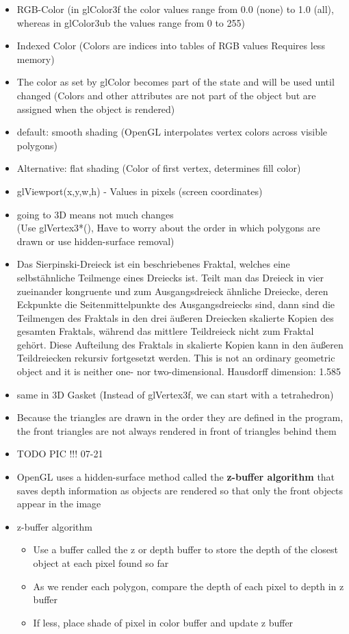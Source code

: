 \documentclass[11pt,a4paper]{article}
\begin{document}
\begin{itemize}
			\item RGB-Color (in glColor3f the color values range from 0.0 (none) to 1.0 (all), whereas in glColor3ub the values range from 0 to 255)
			\item Indexed Color (Colors are indices into tables of RGB values Requires less memory)
			\item The color as set by glColor becomes part of the state and will be used until changed (Colors and other attributes are not part of the object but are assigned when the object is rendered)
			\item default: smooth shading (OpenGL interpolates vertex colors across visible polygons)
			\item Alternative: flat shading (Color of first vertex, determines fill color)
			\item glViewport(x,y,w,h) - Values in pixels (screen coordinates)
			\item going to 3D means not much changes\\
			(Use glVertex3*(), Have to worry about the order in which polygons are drawn or use hidden-surface removal)
			\item Das Sierpinski-Dreieck ist ein beschriebenes Fraktal, welches eine selbstähnliche Teilmenge eines Dreiecks ist. Teilt man das Dreieck in vier zueinander kongruente und zum Ausgangsdreieck ähnliche Dreiecke, deren Eckpunkte die Seitenmittelpunkte des Ausgangsdreiecks sind, dann sind die Teilmengen des Fraktals in den drei äußeren Dreiecken skalierte Kopien des gesamten Fraktals, während das mittlere Teildreieck nicht zum Fraktal gehört. Diese Aufteilung des Fraktals in skalierte Kopien kann in den äußeren Teildreiecken rekursiv fortgesetzt werden. 
			This is not an ordinary geometric object and it is neither one- nor two-dimensional. Hausdorff dimension: 1.585	
			\item same in 3D Gasket (Instead of glVertex3f, we can start with a tetrahedron)
			\item Because the triangles are drawn in the order they are defined in the program, the front triangles are not always rendered in front of triangles behind them
			\item TODO PIC !!! 07-21
			\item OpenGL uses a hidden-surface method called the \textbf{z-buffer algorithm} that saves depth information as objects are rendered so that only the front objects appear in the image
			\item z-buffer algorithm
				\begin{itemize}
					\item Use a buffer called the z or depth buffer to store the depth of the closest object at each pixel found so far
					\item As we render each polygon, compare the depth of each pixel to depth in z buffer
					\item If less, place shade of pixel in color buffer and update z buffer
				\end{itemize}
			

		\end{itemize}
\end{document}
